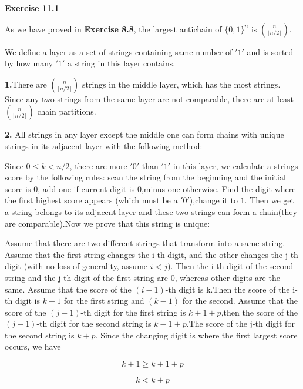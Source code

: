 \documentclass{article} %
\begin{document}
\textbf{Exercise 11.1}\par

	 As we have proved in \textbf{Exercise 8.8}, the largest antichain of $\{0,1\}^n$ is $\binom{n}{\lfloor n/2\rfloor}$. \par

	 We define a layer as a set of strings containing same number of $'1'$ and is sorted by how many  $'1'$ a string in this layer contains.\par

	 \textbf{1.}There are $\binom{n}{\lfloor n/2\rfloor}$ strings in the middle layer, which has the most strings. Since any two strings from the same layer are not comparable, there are at least $\binom{n}{\lfloor n/2\rfloor}$ chain partitions.\par

	 \textbf{2.} All strings in any layer except the middle one can form chains with unique strings in its adjacent layer with the following method:\par

	 Since $0\le k < n/2 $, there are more $'0'$ than $'1'$ in this layer, we calculate a strings score by the following rules: scan the string from the beginning and the initial score is $0$, add one if current digit is $0$,minus one otherwise. Find the digit where the first highest score appears (which must be a $'0'$),change it to $1$. Then we get a string belongs to its adjacent layer and these two strings can form a chain(they are comparable).Now we prove that this string is unique:\par

	 Assume that there are two different strings that transform into a same string. Assume that the first string changes the i-th digit, and the other changes the j-th digit (with no loss of generality, assume $i<j$).  Then the i-th digit of the second string and the j-th digit of the first string are $0$, whereas other digits are the same. Assume that the score of the $(i-1)$-th digit is k.Then the score of the i-th digit is $k+1$ for the first string and $(k-1)$ for the second. Assume that the score of the $(j-1)$-th digit for the first string is $k+1+p$,then the score of the $(j-1)$-th digit for the second string is $k-1+p$.The score of the j-th digit for the second string is $k+p$. Since the changing digit is where the first largest score occurs, we have

	 $$
	 k+1 \ge k+1+p
	 $$

	 $$
	 k<k+p
	 $$
\end{document}
